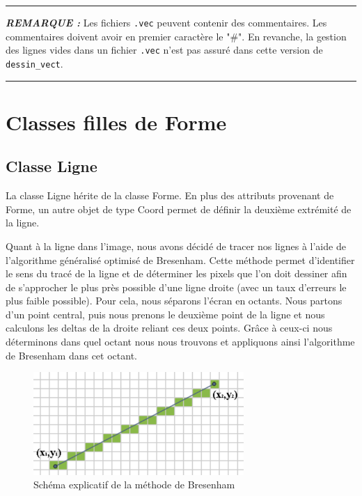 \documentclass[11pt]{article}
\newenvironment{rmq}[1] {\noindent\HRule\par\vspace{5pt}\textbf{\textit{REMARQUE : }}#1}{\\\HRule\par\vspace{5pt}}
\newcommand{\HRule}{\rule{\linewidth}{0.5mm}}
\begin{document}
\clearpage

\begin{rmq}
    Les fichiers \texttt{.vec} peuvent contenir des commentaires. Les commentaires doivent avoir en premier caractère le "\#". En revanche, la gestion des lignes vides dans un fichier \texttt{.vec} n'est pas assuré dans cette version de \texttt{dessin\_vect}. 
\end{rmq}

\section{Classes filles de Forme}

\subsection{Classe Ligne}

La classe Ligne hérite de la classe Forme. En plus des attributs provenant de Forme, un autre objet de type Coord permet de définir la deuxième extrémité de la ligne. 

Quant à la ligne dans l'image, nous avons décidé de tracer nos lignes à l'aide de l’algorithme généralisé optimisé de Bresenham. Cette méthode permet d’identifier le sens du tracé de la ligne et de déterminer les pixels que l'on doit dessiner afin de s'approcher le plus près possible d'une ligne droite (avec un taux d'erreurs le plus faible possible). Pour cela, nous séparons l'écran en octants. Nous partons d'un point central, puis nous prenons le deuxième point de la ligne et nous calculons les deltas de la droite reliant ces deux points. Grâce à ceux-ci nous déterminons dans quel octant nous nous trouvons et appliquons ainsi l'algorithme de Bresenham dans cet octant. \\

\begin{figure}[!htbp]
    \begin{center}
        \includegraphics[width=8cm]{Photo3.png}
        \caption{Schéma explicatif de la méthode de Bresenham}
    \centering
    \end{center}
\end{figure}
\end{document}
